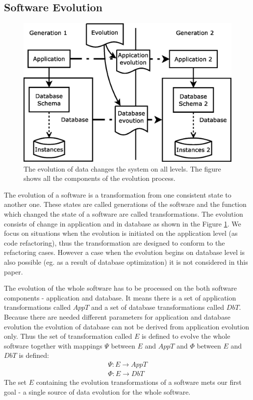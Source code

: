 \documentclass[11pt]{article}
\begin{document}
\subsection{Software Evolution}
\begin{figure}
\centering
	\includegraphics[scale=0.4]{./images/evolution_simple}
	\caption{The evolution of data changes the system on all levels. The figure shows all the components of the evolution process.}
	\label{fig:evolution}
\end{figure}
The evolution of a software is a transformation from one consistent state to another one. These states are called generations of the software and the function which changed the state of a software are called transformations. The evolution consists of change in application and in database as shown in the Figure \ref{fig:evolution}. We focus on situations when the evolution is initiated on the application level (as code refactoring), thus the transformation are designed to conform to the refactoring cases. However a case when the evolution begins on database level is also possible (eg. as a result of database optimization) it is not considered in this paper. 

The evolution of the whole software has to be processed on the both software components - application and database. It means there is a set of application transformations called $AppT$ and a set of database transformations called $DbT$. Because there are needed different parameters for application and database evolution the evolution of database can not be derived from application evolution only. Thus the set of transformation called $E$ is defined to evolve the whole software together with mappings $\Psi$ between $E$ and $AppT$ and $\Phi$ between $E$ and $DbT$ is defined:
\begin{align*}
\Psi : E \rightarrow AppT \\
\Phi : E \rightarrow DbT
\end{align*}
The set $E$ containing the evolution transformations of a software mets our first goal - a single source of data evolution for the whole software.
\end{document}
